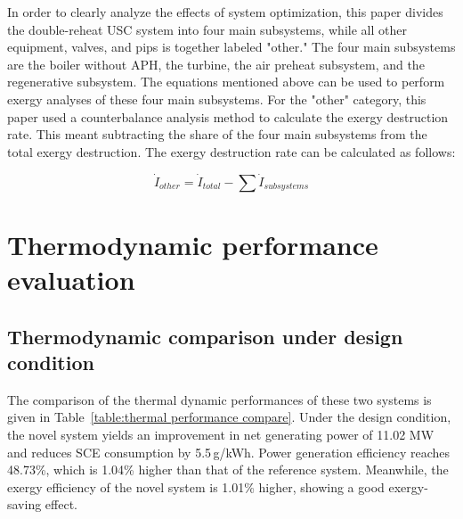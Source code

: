 \documentclass[preprint,12pt]{elsarticle}
\begin{document}
In order to clearly analyze the effects of system optimization, this paper divides the double-reheat USC system into four main subsystems, while all other equipment, valves, and pips is together labeled "other."
The four main subsystems are the boiler without APH, the turbine, the air preheat subsystem, and the regenerative subsystem.
The equations mentioned above can be used to perform exergy analyses of these four main subsystems.
For the "other" category, this paper used a counterbalance analysis method to calculate the exergy destruction rate. This meant subtracting the share of the four main subsystems from the total exergy destruction.
The exergy destruction rate can be calculated as follows:

\begin{equation}
\dot{I}_{other}=\dot{I}{}_{total}-\sum\dot{I}{}_{subsystems}
\end{equation}


\section{Thermodynamic performance evaluation} %
\label{sub:Thermodynamic_evaluation}
\subsection{Thermodynamic comparison under design condition}
\label{ssub:desing_compare}
The comparison of the thermal dynamic performances of these two systems is given in Table~\ref{table:thermal performance compare}. %
Under the design condition, the novel system yields an improvement in net generating power of 11.02 MW and reduces SCE consumption by 5.5\,g/kWh.
Power generation efficiency reaches 48.73\%, which is 1.04\% higher than that of the reference system.
Meanwhile, the exergy efficiency of the novel system is 1.01\% higher, showing a good exergy-saving effect.
\end{document}
